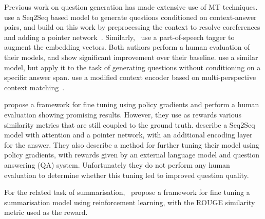 \documentclass[11pt,a4paper]{article}
\begin{document}
Previous work on question generation has made extensive use of MT techniques. \citet{Du} use a Seq2Seq based model to generate questions conditioned on context-answer pairs, and build on this work by preprocessing the context to resolve coreferences and adding a pointer network~\cite{Du2018}. Similarly,~\citet{Zhou2018} use a part-of-speech tagger to augment the embedding vectors. Both authors perform a human evaluation of their models, and show significant improvement over their baseline. \citet{Kumar2018} use a similar model, but apply it to the task of generating questions without conditioning on a specific answer span. \citet{Song} use a modified context encoder based on multi-perspective context matching~\cite{Wang2016}.

\citet{Kumar} propose a framework for fine tuning using policy gradients and perform a human evaluation showing promising results. However, they use as rewards various similarity metrics that are still coupled to the ground truth. \citet{Maluuba} describe a Seq2Seq model with attention and a pointer network, with an additional encoding layer for the answer. They also describe a method for further tuning their model using policy gradients, with rewards given by an external language model and question answering (QA) system. Unfortunately they do not perform any human evaluation to determine whether this tuning led to improved question quality.

For the related task of summarisation,~\citet{Paulus2017} propose a framework for fine tuning a summarisation model using reinforcement learning, with the ROUGE similarity metric used as the reward.
\end{document}
